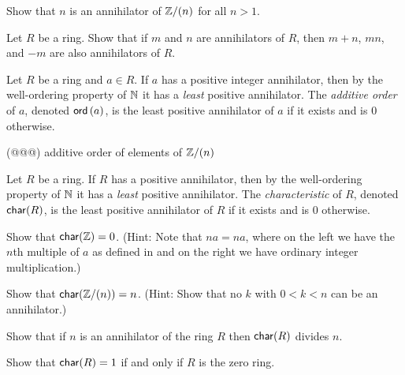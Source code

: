 \begin{exercise}
Show that \(n\) is an annihilator of \(\mathbb{Z}/(n)\) for all \(n > 1\).
\end{exercise}

\begin{exercise}
Let \(R\) be a ring. Show that if \(m\) and \(n\) are annihilators of \(R\), then \(m+n\), \(mn\), and \(-m\) are also annihilators of \(R\).
\end{exercise}

\begin{dfn}
Let \(R\) be a ring and \(a \in R\). If \(a\) has a positive integer annihilator, then by the well-ordering property of \(\mathbb{N}\) it has a \emph{least} positive annihilator. The \emph{additive order} of \(a\), denoted \(\mathsf{ord}\left(a\right)\), is the least positive annihilator of \(a\) if it exists and is \(0\) otherwise.
\end{dfn}

\begin{exercise}
(@@@) additive order of elements of \(\mathbb{Z}/(n)\)
\end{exercise}

\begin{dfn}[Characteristic] \label{dfn:characteristic}
Let \(R\) be a ring. If \(R\) has a positive annihilator, then by the well-ordering property of \(\mathbb{N}\) it has a \emph{least} positive annihilator. The \emph{characteristic}  of \(R\), denoted \(\mathsf{char}(R)\), is the least positive annihilator of \(R\) if it exists and is 0 otherwise.
\end{dfn}

\begin{exercise}
Show that \(\mathsf{char}(\mathbb{Z}) = 0\). (Hint: Note that \(na = na\), where on the left we have the \(n\)th multiple of \(a\) as defined in  and on the right we have ordinary integer multiplication.)
\end{exercise}

\begin{exercise}
Show that \(\mathsf{char}(\mathbb{Z}/(n)) = n\). (Hint: Show that no \(k\) with \(0 < k < n\) can be an annihilator.)
\end{exercise}

\begin{exercise}
Show that if \(n\) is an annihilator of the ring \(R\) then \(\mathsf{char}(R)\) divides \(n\).
\end{exercise}

\begin{exercise}
Show that \(\mathsf{char}(R) = 1\) if and only if \(R\) is the zero ring.
\end{exercise}

